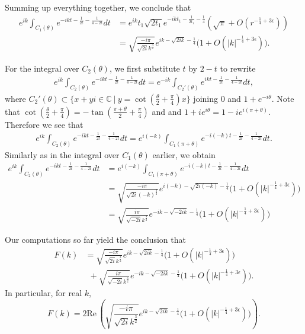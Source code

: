 \documentclass[11pt]{amsart}
\numberwithin{theorem}{section}
\numberwithin{equation}{section}
\theoremstyle{remark}
\theoremstyle{definition}
\newcommand{\re}{\mathrm{Re}\,}
\begin{document}
Summing up everything together, we conclude that
\begin{align*}
e^{ik}\int_{C_1(\theta)}e^{-ikt-\frac{1}{2t}-\frac{1}{4-2t}}dt&=e^{ik}t_1\sqrt{2t_1}e^{-ikt_1-\frac{1}{2t_1}-\frac{1}{4}}\left(\sqrt{\pi}+O(r^{-\frac{1}{4}+3\epsilon})\right)\\
&=\sqrt{\frac{-i\pi}{\sqrt{2i}k^{\frac{3}{2}}}}e^{ik-\sqrt{2ik}-\frac{1}{4 }}\Big(1+O(|k|^{-\frac{1}{4}+3\epsilon})\Big).
\end{align*}

For the integral over $C_2(\theta)$, we first substitute $t$ by $2-t$ to rewrite
\begin{align*}
 e^{ik}\int_{C_2(\theta)} e^{-ikt-\frac{1}{2t}-\frac{1}{4-2t}}dt=e^{-ik}\int_{C_2'(\theta)} e^{ikt-\frac{1}{2t}-\frac{1}{4-2t}}dt,
\end{align*}
where $C_2'(\theta)\subset \{x+yi\in\mathbb{C} \ | \ y=\cot(\frac{\theta}{2}+\frac{\pi}{4})x\} $ joining $0$ and $1+e^{-i\theta}$.
Note that $\cot(\frac{\theta}{2}+\frac{\pi}{4})=-\tan (\frac{\pi+\theta}{2}+\frac{\pi}{4})$ and  and $1+ie^{i\theta}=1-ie^{i(\pi+\theta)}$.
Therefore we see that 
\begin{align*}
 e^{ik}\int_{C_2(\theta)} e^{-ikt-\frac{1}{2t}-\frac{1}{4-2t}}dt= e^{i(-k)}\int_{C_1(\pi +\theta)} e^{-i(-k)t-\frac{1}{2t}-\frac{1}{4-2t}}dt.
\end{align*}
Similarly as in the integral over $C_1(\theta)$ earlier, we obtain
\begin{align*}
e^{ik}\int_{C_2(\theta)}e^{-ikt-\frac{1}{2t}-\frac{1}{4-2t}}dt& =e^{i(-k)}\int_{C_1(\pi+\theta)}e^{-i(-k)t-\frac{1}{2t}-\frac{1}{4-2t}}dt\\
&=\sqrt{\frac{-i\pi}{\sqrt{2i}(-k)^{\frac{3}{2}}}}e^{i(-k)-\sqrt{2i(-k)}-\frac{1}{4 }}\Big(1+O(|k|^{-\frac{1}{4}+3\epsilon})\Big)\\
&=\sqrt{\frac{i\pi}{\sqrt{-2i}k^{\frac{3}{2}}}}e^{-ik-\sqrt{-2ik}-\frac{1}{4 }}\Big(1+O(|k|^{-\frac{1}{4}+3\epsilon})\Big)
\end{align*}

Our computations so far yield the conclusion that
\begin{align*}
F(k)&=\sqrt{\frac{-i\pi}{\sqrt{2i}k^{\frac{3}{2}}}}e^{ik-\sqrt{2ik}-\frac{1}{4 }}\Big(1+O(|k|^{-\frac{1}{4}+3\epsilon})\Big)\\
& \ \ +\sqrt{\frac{i\pi}{\sqrt{-2i}k^{\frac{3}{2}}}}e^{-ik-\sqrt{-2ik}-\frac{1}{4 }}\Big(1+O(|k|^{-\frac{1}{4}+3\epsilon})\Big).
\end{align*}
In particular, for real $k$,
$$F(k)=2\re \left(\sqrt{\frac{-i\pi}{\sqrt{2i}k^{\frac{3}{2}}}}e^{ik-\sqrt{2ik}-\frac{1}{4 }}\Big(1+O(|k|^{-\frac{1}{4}+3\epsilon})\Big)\right).$$
\end{document}
